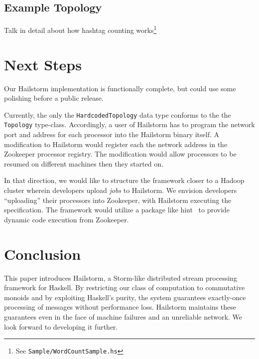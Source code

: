 \documentclass[10pt,nocopyrightspace]{sigplanconf}
\begin{document}
\subsection{Example Topology}
Talk in detail about how hashtag counting works\footnote{See
\texttt{Sample/WordCountSample.hs}}

\section{Next Steps}
Our Hailstorm implementation is functionally complete, but could use some
polishing before a public release. 

Currently, the only the \texttt{HardcodedTopology} data type conforms to the the
\texttt{Topology} type-class. Accordingly, a user of Hailstorm has to program
the network port and address for each processor into the Hailstorm binary
itself. A modification to Hailstorm would register each the network address 
in the Zookeeper processor registry. The modification would allow processors to
be resumed on different machines then they started on.

In that direction, we would like to structure the framework closer to a Hadoop
cluster wherein developers upload \textit{jobs} to Hailstorm. We envision
developers ``uploading'' their processors into Zookeeper, with Hailstorm
executing the specification. The framework would utilize a package like
hint~\cite{hint} to provide dynamic code execution from Zookeeper.

\section{Conclusion}
This paper introduces Hailstorm, a Storm-like distributed stream processing
framework for Haskell. By restricting our class of computation to commutative
monoids and by exploiting Haskell's purity, the system guarantees exactly-once
processing of messages without performance loss. Hailstorm maintains these
guarantees even in the face of machine failures and an unreliable network. We
look forward to developing it further.

{}

\end{document}
